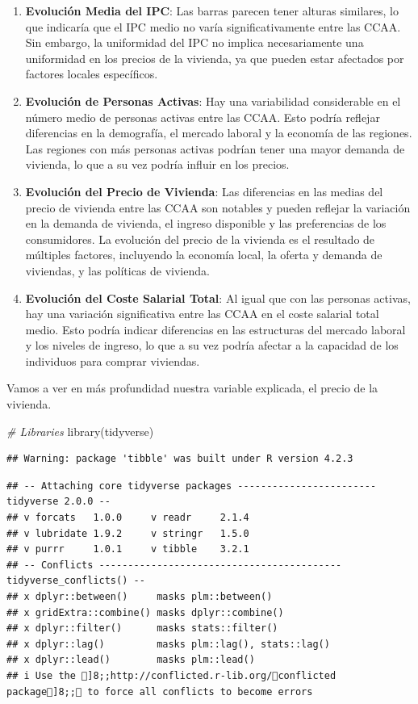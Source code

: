 \documentclass[
]{article}
\newenvironment{Shaded}{\begin{snugshade}}{\end{snugshade}}
\newcommand{\CommentTok}[1]{\textcolor[rgb]{0.56,0.35,0.01}{\textit{#1}}}
\newcommand{\FunctionTok}[1]{\textcolor[rgb]{0.00,0.00,0.00}{#1}}
\newcommand{\NormalTok}[1]{#1}
\begin{document}
\begin{enumerate}
\def\labelenumi{\arabic{enumi}.}
\item
  \textbf{Evolución Media del IPC}: Las barras parecen tener alturas
  similares, lo que indicaría que el IPC medio no varía
  significativamente entre las CCAA. Sin embargo, la uniformidad del IPC
  no implica necesariamente una uniformidad en los precios de la
  vivienda, ya que pueden estar afectados por factores locales
  específicos.
\item
  \textbf{Evolución de Personas Activas}: Hay una variabilidad
  considerable en el número medio de personas activas entre las CCAA.
  Esto podría reflejar diferencias en la demografía, el mercado laboral
  y la economía de las regiones. Las regiones con más personas activas
  podrían tener una mayor demanda de vivienda, lo que a su vez podría
  influir en los precios.
\item
  \textbf{Evolución del Precio de Vivienda}: Las diferencias en las
  medias del precio de vivienda entre las CCAA son notables y pueden
  reflejar la variación en la demanda de vivienda, el ingreso disponible
  y las preferencias de los consumidores. La evolución del precio de la
  vivienda es el resultado de múltiples factores, incluyendo la economía
  local, la oferta y demanda de viviendas, y las políticas de vivienda.
\item
  \textbf{Evolución del Coste Salarial Total}: Al igual que con las
  personas activas, hay una variación significativa entre las CCAA en el
  coste salarial total medio. Esto podría indicar diferencias en las
  estructuras del mercado laboral y los niveles de ingreso, lo que a su
  vez podría afectar a la capacidad de los individuos para comprar
  viviendas.
\end{enumerate}

Vamos a ver en más profundidad nuestra variable explicada, el precio de
la vivienda.

\begin{Shaded}
\begin{Highlighting}[]
\CommentTok{\# Libraries}
\FunctionTok{library}\NormalTok{(tidyverse)}
\end{Highlighting}
\end{Shaded}

\begin{verbatim}
## Warning: package 'tibble' was built under R version 4.2.3
\end{verbatim}

\begin{verbatim}
## -- Attaching core tidyverse packages ------------------------ tidyverse 2.0.0 --
## v forcats   1.0.0     v readr     2.1.4
## v lubridate 1.9.2     v stringr   1.5.0
## v purrr     1.0.1     v tibble    3.2.1
## -- Conflicts ------------------------------------------ tidyverse_conflicts() --
## x dplyr::between()     masks plm::between()
## x gridExtra::combine() masks dplyr::combine()
## x dplyr::filter()      masks stats::filter()
## x dplyr::lag()         masks plm::lag(), stats::lag()
## x dplyr::lead()        masks plm::lead()
## i Use the ]8;;http://conflicted.r-lib.org/conflicted package]8;; to force all conflicts to become errors
\end{verbatim}
\end{document}

